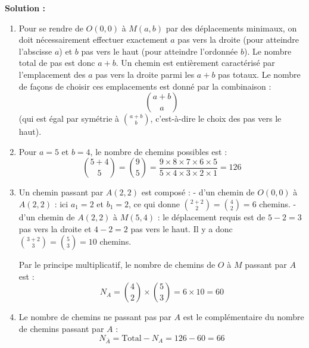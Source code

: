 \textbf{Solution :}
\begin{enumerate}
    \item Pour se rendre de $O(0,0)$ à $M(a,b)$ par des déplacements minimaux, on doit nécessairement effectuer exactement $a$ pas vers la droite (pour atteindre l'abscisse $a$) et $b$ pas vers le haut (pour atteindre l'ordonnée $b$).
    Le nombre total de pas est donc $a+b$. Un chemin est entièrement caractérisé par l'emplacement des $a$ pas vers la droite parmi les $a+b$ pas totaux. Le nombre de façons de choisir ces emplacements est donné par la combinaison :
    \[
    \binom{a+b}{a}
    \]
    (qui est égal par symétrie à $\binom{a+b}{b}$, c'est-à-dire le choix des pas vers le haut).
    
    \item Pour $a=5$ et $b=4$, le nombre de chemins possibles est :
    \[
    \binom{5+4}{5} = \binom{9}{5} = \frac{9 \times 8 \times 7 \times 6 \times 5}{5 \times 4 \times 3 \times 2 \times 1} = 126
    \]
    
    \item Un chemin passant par $A(2,2)$ est composé :
    - d'un chemin de $O(0,0)$ à $A(2,2)$ : ici $a_1=2$ et $b_1=2$, ce qui donne $\binom{2+2}{2} = \binom{4}{2} = 6$ chemins.
    - d'un chemin de $A(2,2)$ à $M(5,4)$ : le déplacement requis est de $5-2=3$ pas vers la droite et $4-2=2$ pas vers le haut. Il y a donc $\binom{3+2}{3} = \binom{5}{3} = 10$ chemins.
    
    Par le principe multiplicatif, le nombre de chemins de $O$ à $M$ passant par $A$ est :
    \[
    N_A = \binom{4}{2} \times \binom{5}{3} = 6 \times 10 = 60
    \]
    
    \item Le nombre de chemins ne passant pas par $A$ est le complémentaire du nombre de chemins passant par $A$ :
    \[
    N_{\bar{A}} = \text{Total} - N_A = 126 - 60 = 66
    \]
    

\end{enumerate}
